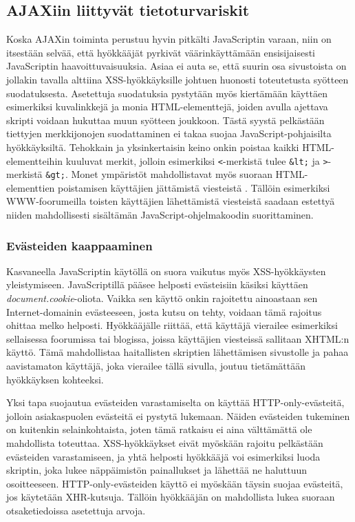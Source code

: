 \subsection{AJAXiin liittyvät tietoturvariskit}

Koska AJAXin toiminta perustuu hyvin pitkälti JavaScriptin varaan,
niin on itsestään selvää, että hyökkääjät pyrkivät väärinkäyttämään
ensisijaisesti JavaScriptin haavoittuvaisuuksia.  Asiaa ei auta se,
että suurin osa sivustoista on jollakin tavalla alttiina
XSS-hyök\-käyk\-sil\-le \cite{WEB2c} johtuen huonosti toteutetusta syötteen
suodatuksesta. Asetettuja suodatuksia pystytään myös kiertämään
käyttäen esimerkiksi kuvalinkkejä ja monia HTML-elementtejä,
joiden avulla ajettava skripti voidaan hukuttaa muun syötteen
joukkoon. Tästä syystä pelkästään tiettyjen merkkijonojen
suodattaminen ei takaa suojaa JavaScript-pohjaisilta
hyökkäyksiltä. Tehokkain ja yksinkertaisin keino onkin poistaa kaikki
HTML-e\-le\-ment\-tei\-hin kuuluvat merkit, jolloin esimerkiksi \texttt{<}-merkistä tulee
\texttt{\&lt;} ja \texttt{>}-merkistä \texttt{\&gt;}. Monet ympäristöt
mahdollistavat myös suoraan HTML-e\-le\-ment\-ti\-en poistamisen käyttäjien
jättämistä viesteistä \cite{AJAX}. Tällöin esimerkiksi WWW-foo\-ru\-meil\-la
toisten käyttäjien lähettämistä viesteistä saadaan estettyä
niiden mahdollisesti sisältämän JavaScript-ohjelmakoodin suorittaminen.

\subsubsection{Evästeiden kaappaaminen}

Kasvaneella JavaScriptin käytöllä on suora vaikutus myös
XSS-hyök\-käys\-ten yleistymiseen. JavaScriptillä pääsee helposti
evästeisiin käsiksi käyttäen \emph{document.cookie}-oliota. Vaikka sen
käyttö onkin rajoitettu ainoastaan sen Internet-domainin evästeeseen,
josta kutsu on tehty, voidaan tämä rajoitus ohittaa melko
helposti. Hyökkääjälle riittää, että käyttäjä vierailee esimerkiksi
sellaisessa foorumissa tai blogissa, joissa käyttäjien viesteissä
sallitaan XHTML:n käyttö. Tämä mahdollistaa haitallisten skriptien
lähettämisen sivustolle ja pahaa aavistamaton käyttäjä, joka vierailee
tällä sivulla, joutuu tietämättään hyökkäyksen kohteeksi.

Yksi tapa suojautua evästeiden varastamiselta on käyttää
HTTP-only-evästeitä, jolloin asiakaspuolen evästeitä ei pystytä
lukemaan. Näiden evästeiden tukeminen on kuitenkin selainkohtaista,
joten tämä ratkaisu ei aina välttämättä ole mahdollista
toteuttaa. XSS-hyök\-käyk\-set eivät myöskään rajoitu pelkästään
evästeiden varastamiseen, ja yhtä helposti hyökkääjä voi esimerkiksi
luoda skriptin, joka lukee näppäimistön painallukset ja lähettää ne
haluttuun osoitteeseen. HTTP-only-evästeiden käyttö ei myöskään täysin
suojaa evästeitä, jos käytetään XHR-kutsuja. Tällöin hyökkääjän on
mahdollista lukea suoraan otsaketiedoissa asetettuja arvoja.

